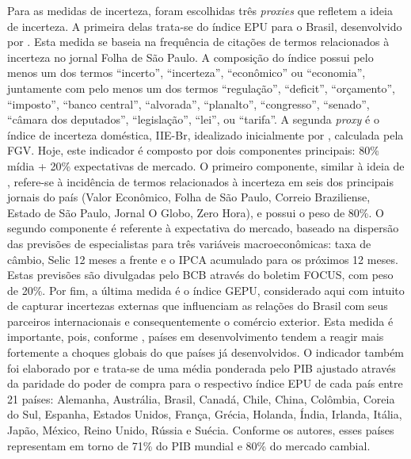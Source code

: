 Para as medidas de incerteza, foram escolhidas três \textit{proxies} que refletem a ideia de incerteza. A primeira delas trata-se do índice \gls{EPU} para o Brasil, desenvolvido por . Esta medida se baseia na frequência de citações de termos relacionados à incerteza no jornal Folha de São Paulo. A composição do índice possui pelo menos um dos termos ``incerto'', ``incerteza'', ``econômico'' ou ``economia'', juntamente com pelo menos um dos termos ``regulação'', ``deficit'', ``orçamento'', ``imposto'', ``banco central'', ``alvorada'', ``planalto'', ``congresso'', ``senado'', ``câmara dos deputados'', ``legislação'', ``lei'', ou ``tarifa''.  A segunda \textit{proxy} é o índice de incerteza doméstica, \gls{IIE-Br}, idealizado inicialmente por , calculada pela \gls{FGV}. Hoje, este indicador é composto por dois componentes principais: 80\% mídia + 20\% expectativas de mercado. O primeiro componente, similar à ideia de , refere-se à incidência de termos relacionados à incerteza em seis dos principais jornais do país (Valor Econômico, Folha de São Paulo, Correio Braziliense, Estado de São
Paulo, Jornal O Globo, Zero Hora), e possui o peso de 80\%. O segundo componente é referente à expectativa do mercado, baseado na dispersão das previsões de especialistas para três variáveis macroeconômicas: taxa de câmbio, \gls{Selic} 12 meses a frente e o \gls{IPCA} acumulado para os próximos 12 meses. Estas previsões são divulgadas pelo \gls{BCB} através do boletim FOCUS, com peso de 20\%. Por fim, a última medida é o índice \gls{GEPU}, considerado aqui com intuito de capturar incertezas externas que influenciam as relações do Brasil com seus parceiros internacionais e consequentemente o comércio exterior. Esta medida é importante, pois, conforme , países em desenvolvimento tendem a reagir mais fortemente a choques globais do que países já desenvolvidos. O indicador também foi elaborado por  e trata-se de uma média ponderada pelo \gls{PIB} ajustado através da paridade do poder de compra para o respectivo índice \gls{EPU} de cada país entre 21 países: Alemanha, Austrália, Brasil, Canadá, Chile, China, Colômbia, Coreia do Sul, Espanha, Estados Unidos, França, Grécia, Holanda, Índia, Irlanda, Itália, Japão, México, Reino Unido, Rússia e Suécia. Conforme os autores, esses países representam em torno de 71\% do \gls{PIB} mundial e 80\% do mercado cambial. 
\par

